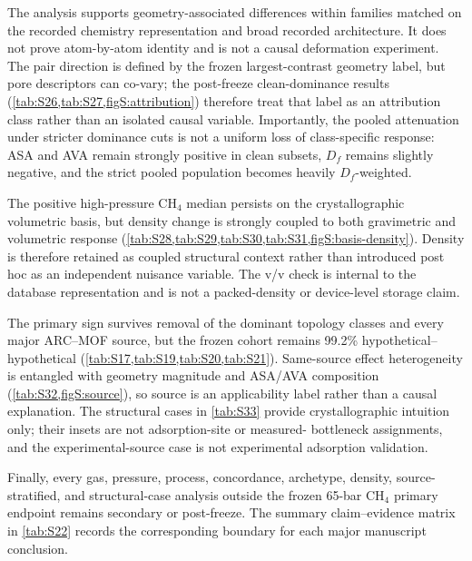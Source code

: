 \documentclass[11pt,a4paper]{article}
\begin{document}
The analysis supports geometry-associated differences within families matched on the
recorded chemistry representation and broad recorded architecture. It does not
prove atom-by-atom identity and is not a causal deformation experiment. The pair
direction is defined by the frozen largest-contrast geometry label, but pore
descriptors can co-vary; the post-freeze clean-dominance results
(\cref{tab:S26,tab:S27,figS:attribution}) therefore treat that label as an
attribution class rather than an isolated causal variable. Importantly, the pooled
attenuation under stricter dominance cuts is not a uniform loss of class-specific
response: ASA and AVA remain strongly positive in clean subsets, $D_f$ remains
slightly negative, and the strict pooled population becomes heavily $D_f$-weighted.

The positive high-pressure CH$_4$ median persists on the crystallographic
volumetric basis, but density change is strongly coupled to both gravimetric and
volumetric response (\cref{tab:S28,tab:S29,tab:S30,tab:S31,figS:basis-density}).
Density is therefore retained as coupled structural context rather than introduced
post hoc as an independent nuisance variable. The v/v check is internal to the
database representation and is not a packed-density or device-level storage claim.

The primary sign survives removal of the dominant topology classes and every major
ARC--MOF source, but the frozen cohort remains 99.2\%
hypothetical--hypothetical (\cref{tab:S17,tab:S19,tab:S20,tab:S21}). Same-source
effect heterogeneity is entangled with geometry magnitude and ASA/AVA composition
(\cref{tab:S32,figS:source}), so source is an applicability label rather than a
causal explanation. The structural cases in \cref{tab:S33} provide
crystallographic intuition only; their insets are not adsorption-site or measured-
bottleneck assignments, and the experimental-source case is not experimental
adsorption validation.

Finally, every gas, pressure, process, concordance, archetype, density,
source-stratified, and structural-case analysis outside the frozen 65-bar CH$_4$
primary endpoint remains secondary or post-freeze. The summary claim--evidence
matrix in \cref{tab:S22} records the corresponding boundary for each major
manuscript conclusion.


\clearpage


\end{document}

